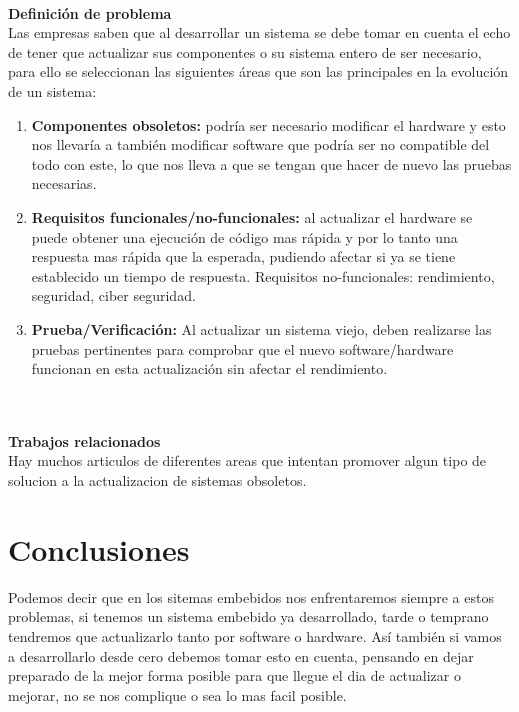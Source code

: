 \documentclass{article}
\begin{document}
\\{\bf Definición de problema}\\
Las empresas saben que al desarrollar un sistema se debe tomar en cuenta el echo de tener que actualizar sus componentes o su sistema entero de ser necesario, para ello se seleccionan las siguientes áreas que son las principales en la evolución de un sistema:\\

\begin{enumerate}
    \item {\bf Componentes obsoletos:} podría ser necesario modificar el hardware y esto nos llevaría a también modificar software que podría ser no compatible del todo con este, lo que nos lleva a que se tengan que hacer de nuevo las pruebas necesarias.
    \item {\bf Requisitos funcionales/no-funcionales:} al actualizar el hardware se puede obtener una ejecución de código mas rápida y por lo tanto una respuesta mas rápida que la esperada, pudiendo afectar si ya se tiene establecido un tiempo de respuesta.
Requisitos no-funcionales: rendimiento, seguridad, ciber seguridad.
    \item {\bf Prueba/Verificación:} Al actualizar un sistema viejo, deben realizarse las pruebas pertinentes para comprobar que el nuevo software/hardware funcionan en esta actualización sin afectar el rendimiento.
\end{enumerate}\\

\\{\bf Trabajos relacionados}\\
Hay muchos articulos de diferentes areas que intentan promover algun tipo de solucion a la actualizacion de sistemas obsoletos.



\section{Conclusiones}
Podemos decir que en los sitemas embebidos nos enfrentaremos siempre a estos problemas, si tenemos un sistema embebido ya desarrollado, tarde o temprano tendremos que actualizarlo tanto por software o hardware. Así también si vamos a desarrollarlo desde cero debemos tomar esto en cuenta, pensando en dejar preparado de la mejor forma posible para que llegue el dia de actualizar o mejorar, no se nos complique o sea lo mas facil posible.
\end{document}
